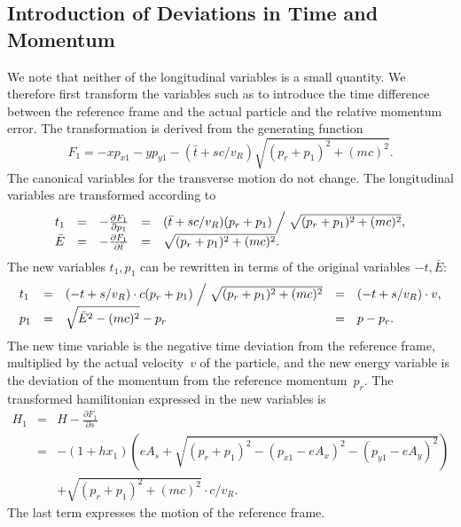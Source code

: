 \documentclass{report}
\begin{document}
\subsection{Introduction of Deviations in Time and Momentum}
We note that neither of the longitudinal variables is a small quantity.
We therefore first transform the variables such as to introduce the
time difference between the reference frame and the actual particle 
and the relative momentum error.
The transformation is derived from the generating function
\begin{equation}
  F_1 = -x p_{x1}-y p_{y1} - (\bar{t}+sc/v_R) \sqrt{(p_r+p_1)^2+(mc)^2}.
\end{equation}
The canonical variables for the transverse motion do not change.
The longitudinal variables are transformed according to
\begin{equation}\begin{array}{lclcl}
  t_1&=&-\frac{\partial F_1}{\partial p_1}
     &=&(\bar{t}+sc/v_R) (p_r+p_1)\Bigm/\sqrt{(p_r+p_1)^2+(mc)^2}, \\
  \bar{E}&=&-\frac{\partial F_1}{\partial \bar{t}}
         &=&\sqrt{(p_r+p_1)^2+(mc)^2}.
\end{array}\end{equation}
The new variables $t_1, p_1$ can be rewritten in terms of the original
variables $-t, \bar{E}$:
\begin{equation}
  \begin{array}{lclcl}
    t_1&=&(-t+s/v_R) \cdot c(p_r+p_1)\Bigm/\sqrt{(p_r+p_1)^2+(mc)^2}
    &=&(-t+s/v_R) \cdot v, \\
    p_1&=&\sqrt{\bar{E}^2-(mc)^2}-p_r
    &=&p-p_r.
  \end{array}
\end{equation}
The new time variable is the negative time deviation from the
reference frame, multiplied by the actual velocity~$v$ of the
particle,
and the new energy variable is the deviation of the momentum from the 
reference momentum~$p_r$.
The transformed hamilitonian expressed in the new variables is
\begin{equation}
  \begin{array}{lcl}
    H_1&=&H - \frac{\partial F_1}{\partial s}\\
    &=&- (1+h x_1)
    \left(
      e A_s +
      \sqrt{(p_r+p_1)^2-(p_{x1}-eA_x)^2-(p_{y1}-eA_y)^2}
    \right)\\
    &&+ \sqrt{(p_r+p_1)^2+(mc)^2} \cdot c/v_R.
  \end{array}
  \label{eq:ham}
\end{equation}
The last term expresses the motion of the reference frame.
\end{document}
